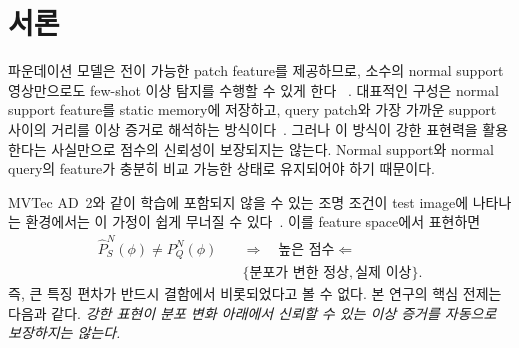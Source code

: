 \section{서론}
\label{sec:introduction}


파운데이션 모델은 전이 가능한 patch feature를 제공하므로, 소수의 normal
support 영상만으로도 few-shot 이상 탐지를 수행할 수 있게 한다
~\cite{oquab2024dinov2,damm2025anomalydino}. 대표적인 구성은 normal support
feature를 static memory에 저장하고, query patch와 가장 가까운 support 사이의
거리를 이상 증거로 해석하는 방식이다~\cite{roth2022patchcore,damm2025anomalydino}.
그러나 이 방식이 강한 표현력을
활용한다는 사실만으로 점수의 신뢰성이 보장되지는 않는다. Normal support와
normal query의 feature가 충분히 비교 가능한 상태로 유지되어야 하기 때문이다.

MVTec AD~2와 같이 학습에 포함되지 않을 수 있는 조명 조건이 test image에
나타나는 환경에서는 이 가정이 쉽게 무너질 수 있다~\cite{hecklerkram2026mvtecad2}.
이를 feature space에서 표현하면
\begin{equation}
  \begin{aligned}
    \widehat P_S^N(\phi) \neq P_Q^N(\phi)
    \quad&\Longrightarrow\quad
    \text{높은 점수}\Leftarrow \\
    &\{\text{분포가 변한 정상},\text{실제 이상}\}.
  \end{aligned}
  \label{eq:score_ambiguity}
\end{equation}
즉, 큰 특징 편차가 반드시 결함에서 비롯되었다고 볼 수 없다. 본 연구의 핵심
전제는 다음과 같다. \emph{강한 표현이 분포 변화 아래에서 신뢰할 수 있는 이상
증거를 자동으로 보장하지는 않는다.}

